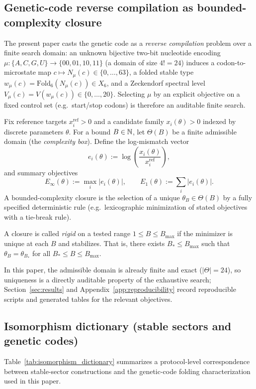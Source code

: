 \subsection{Genetic-code reverse compilation as bounded-complexity closure}
The present paper casts the genetic code as a \emph{reverse compilation} problem over a finite search domain: an unknown bijective two-bit nucleotide encoding $\mu:\{A,C,G,U\}\to\{00,01,10,11\}$ (a domain of size $4!=24$) induces a codon-to-microstate map $c\mapsto N_\mu(c)\in\{0,\dots,63\}$, a folded stable type $w_\mu(c)=\mathrm{Fold}_6(N_\mu(c))\in X_6$, and a Zeckendorf spectral level $V_\mu(c)=V(w_\mu(c))\in\{0,\dots,20\}$.
Selecting $\mu$ by an explicit objective on a fixed control set (e.g.\ start/stop codons) is therefore an auditable finite search.

\begin{definition}\label{def:bc_closure_audit}
Fix reference targets $x_i^{\mathrm{ref}}>0$ and a candidate family $x_i(\theta)>0$ indexed by discrete parameters $\theta$.
For a bound $B\in\mathbb{N}$, let $\Theta(B)$ be a finite admissible domain (the \emph{complexity box}).
Define the log-mismatch vector
\[
e_i(\theta):=\log\!\left(\frac{x_i(\theta)}{x_i^{\mathrm{ref}}}\right),
\]
and summary objectives
\[
E_\infty(\theta):=\max_i |e_i(\theta)|,\qquad
E_1(\theta):=\sum_i |e_i(\theta)|.
\]
A bounded-complexity closure is the selection of a unique $\theta_B\in\Theta(B)$ by a fully specified deterministic rule (e.g.\ lexicographic minimization of stated objectives with a tie-break rule).
\end{definition}

\begin{definition}\label{def:rigidity_certificate_audit}
A closure is called \emph{rigid} on a tested range $1\le B\le B_{\max}$ if the minimizer is unique at each $B$ and stabilizes.
That is, there exists $B_\ast\le B_{\max}$ such that $\theta_B=\theta_{B_\ast}$ for all $B_\ast\le B\le B_{\max}$.
\end{definition}

In this paper, the admissible domain is already finite and exact ($|\Theta|=24$), so uniqueness is a directly auditable property of the exhaustive search; Section~\ref{sec:results} and Appendix~\ref{app:reproducibility} record reproducible scripts and generated tables for the relevant objectives.

\subsection{Isomorphism dictionary (stable sectors and genetic codes)}
Table~\ref{tab:isomorphism_dictionary} summarizes a protocol-level correspondence between stable-sector constructions and the genetic-code folding characterization used in this paper.

